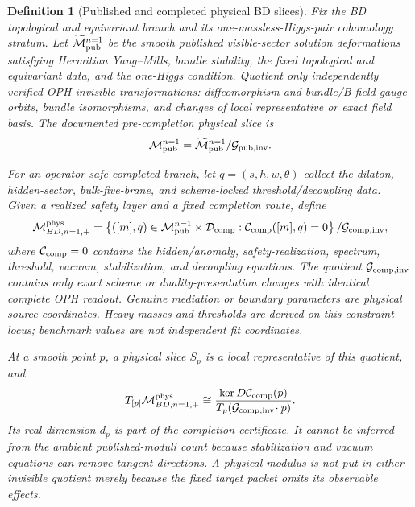 \documentclass[11pt]{article}
\newtheorem{definition}[theorem]{Definition}
\theoremstyle{remark}
\theoremstyle{plain}
\begin{document}
\begin{definition}[Published and completed physical BD slices]\label{def:bd-physical-slice}
Fix the BD topological and equivariant branch and its one-massless-Higgs-pair cohomology stratum.
Let \(\widetilde{\mathcal M}_{\rm pub}^{n=1}\) be the smooth published visible-sector solution
deformations satisfying Hermitian Yang--Mills, bundle stability, the fixed topological and
equivariant data, and the one-Higgs condition. Quotient only independently verified OPH-invisible
transformations:
diffeomorphism and bundle/B-field gauge orbits, bundle isomorphisms, and changes of local
representative or exact field basis. The documented pre-completion physical slice is
\[
\mathcal M_{\rm pub}^{n=1}
=
\widetilde{\mathcal M}_{\rm pub}^{n=1}/\mathcal G_{\rm pub,inv}.
\]

For an operator-safe completed branch, let \(q=(s,h,w,\theta)\) collect the dilaton,
hidden-sector, bulk-five-brane, and scheme-locked threshold/decoupling data. Given a realized
safety layer and a fixed completion route, define
\[
\mathcal M^{\rm phys}_{BD,n=1,+}
=
\left\{([m],q)\in\mathcal M_{\rm pub}^{n=1}\times\mathcal D_{\rm comp}:
\mathcal C_{\rm comp}([m],q)=0\right\}/\mathcal G_{\rm comp,inv},
\]
where \(\mathcal C_{\rm comp}=0\) contains the hidden/anomaly, safety-realization, spectrum,
threshold, vacuum, stabilization, and decoupling equations. The quotient
\(\mathcal G_{\rm comp,inv}\) contains only exact scheme or duality-presentation changes with
identical complete OPH readout. Genuine mediation or boundary parameters are physical source
coordinates. Heavy masses and thresholds are derived on this constraint locus; benchmark values
are not independent fit coordinates.

At a smooth point \(p\), a physical slice \(S_p\) is a local representative of this quotient, and
\[
T_{[p]}\mathcal M^{\rm phys}_{BD,n=1,+}
\cong
\frac{\ker D\mathcal C_{\rm comp}(p)}
{T_p(\mathcal G_{\rm comp,inv}\!\cdot p)}.
\]
Its real dimension \(d_p\) is part of the completion certificate. It cannot be inferred from the
ambient published-moduli count because stabilization and vacuum equations can remove tangent
directions. A physical modulus is not put in either invisible quotient merely because the fixed
target packet omits its observable effects.
\end{definition}
\end{document}
